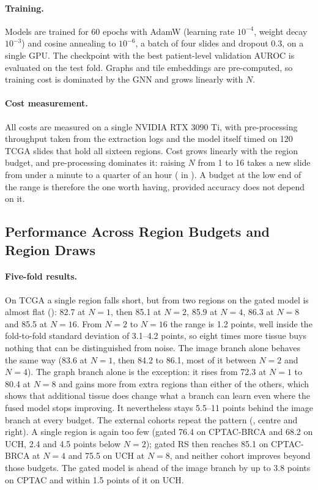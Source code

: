 \documentclass{midl} %
\begin{document}
\paragraph{Training.}
Models are trained for 60 epochs with AdamW (learning rate $10^{-4}$, weight decay $10^{-3}$)
and cosine annealing to $10^{-6}$, a batch of four slides and dropout 0.3, on a single
GPU. The checkpoint with the best patient-level validation AUROC is evaluated on the test fold.
Graphs and tile embeddings are pre-computed, so training cost is dominated by the GNN and grows
linearly with $N$.

\paragraph{Cost measurement.}
All costs are measured on a single NVIDIA RTX 3090 Ti, with pre-processing throughput taken
from the extraction logs and the model itself timed on 120 TCGA slides that hold all sixteen
regions. Cost grows linearly with the region budget, and pre-processing dominates it: raising
$N$ from 1 to 16 takes a new slide from under a minute to a quarter of an hour
( in ). A budget at the low end of the range is therefore the one worth having,
provided accuracy does not depend on it.

\subsection{Performance Across Region Budgets and Region Draws}
\label{sec:more-region-sampling}

\paragraph{Five-fold results.}
On TCGA a single region falls short, but from two regions on the gated model is almost flat
(): 82.7 at $N=1$, then 85.1 at $N=2$, 85.9 at $N=4$, 86.3 at $N=8$
and 85.5 at $N=16$. From $N=2$ to $N=16$ the range is 1.2 points, well inside the fold-to-fold
standard deviation of 3.1--4.2 points, so eight times more tissue buys nothing that can be
distinguished from noise. The image branch alone behaves the same way (83.6 at $N=1$, then
84.2 to 86.1, most of it between $N=2$ and $N=4$). The graph branch alone is the exception: it
rises from 72.3 at $N=1$ to 80.4 at $N=8$ and gains more from extra regions than either of the
others, which shows that additional tissue does change what a branch can learn even where the
fused model stops improving. It nevertheless stays 5.5--11 points behind the image branch at
every budget. The external cohorts repeat the pattern (, centre and
right). A single region is again too few (gated 76.4 on CPTAC-BRCA and 68.2 on UCH, 2.4 and
4.5 points below $N=2$); gated RS then reaches 85.1 on CPTAC-BRCA at $N=4$ and 75.5 on UCH at
$N=8$, and neither cohort improves beyond those budgets. The gated model is ahead of the image
branch by up to 3.8 points on CPTAC and within 1.5 points of it on UCH.
\end{document}
